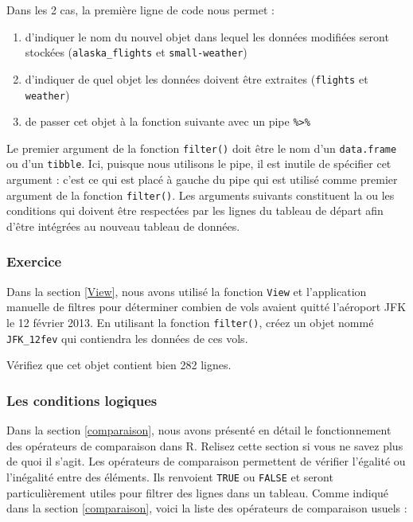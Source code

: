 \documentclass[a4paperpaper,]{article}
\providecommand{\tightlist}{%
  \setlength{\itemsep}{0pt}\setlength{\parskip}{0pt}}
\theoremstyle{definition}
\theoremstyle{definition}
\theoremstyle{definition}
\theoremstyle{remark}
\begin{document}
Dans les 2 cas, la première ligne de code nous permet :

\begin{enumerate}
\def\labelenumi{\arabic{enumi}.}
\tightlist
\item
  d'indiquer le nom du nouvel objet dans lequel les données modifiées
  seront stockées (\texttt{alaska\_flights} et \texttt{small-weather})
\item
  d'indiquer de quel objet les données doivent être extraites
  (\texttt{flights} et \texttt{weather})
\item
  de passer cet objet à la fonction suivante avec un pipe
  \texttt{\%\textgreater{}\%}
\end{enumerate}

Le premier argument de la fonction \texttt{filter()} doit être le nom
d'un \texttt{data.frame} ou d'un \texttt{tibble}. Ici, puisque nous
utilisons le pipe, il est inutile de spécifier cet argument : c'est ce
qui est placé à gauche du pipe qui est utilisé comme premier argument de
la fonction \texttt{filter()}. Les arguments suivants constituent la ou
les conditions qui doivent être respectées par les lignes du tableau de
départ afin d'être intégrées au nouveau tableau de données.

\subsubsection{Exercice}\label{exercice-1}

Dans la section \ref{View}, nous avons utilisé la fonction \texttt{View}
et l'application manuelle de filtres pour déterminer combien de vols
avaient quitté l'aéroport JFK le 12 février 2013. En utilisant la
fonction \texttt{filter()}, créez un objet nommé \texttt{JFK\_12fev} qui
contiendra les données de ces vols.

Vérifiez que cet objet contient bien 282 lignes.

\subsubsection{Les conditions logiques}\label{les-conditions-logiques}

Dans la section \ref{comparaison}, nous avons présenté en détail le
fonctionnement des opérateurs de comparaison dans R. Relisez cette
section si vous ne savez plus de quoi il s'agit. Les opérateurs de
comparaison permettent de vérifier l'égalité ou l'inégalité entre des
éléments. Ils renvoient \texttt{TRUE} ou \texttt{FALSE} et seront
particulièrement utiles pour filtrer des lignes dans un tableau. Comme
indiqué dans la section \ref{comparaison}, voici la liste des opérateurs
de comparaison usuels :
\end{document}
